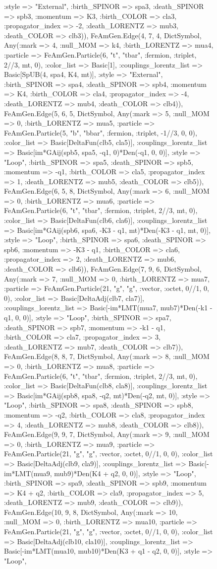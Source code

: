 \documentclass{revtex4}
\begin{document}
\begin{figure}[!htb]
\begin{center}
{:style => "External", :birth_SPINOR => spa3, :death_SPINOR => spb3, :momentum => K3, :birth_COLOR => cla3, :propagator_index => -2, :death_LORENTZ => mub3, :death_COLOR => clb3)), FeAmGen.Edge(4, 7, 4, Dict{Symbol, Any}(:mark => 4, :null_MOM => k4, :birth_LORENTZ => mua4, :particle => FeAmGen.Particle(6, "t", "tbar", :fermion, :triplet, 2//3, mt, 0), :color_list => Basic[1], :couplings_lorentz_list => Basic[SpUB(4, spa4, K4, mt)], :style => "External", :birth_SPINOR => spa4, :death_SPINOR => spb4, :momentum => K4, :birth_COLOR => cla4, :propagator_index => -4, :death_LORENTZ => mub4, :death_COLOR => clb4)), FeAmGen.Edge(5, 6, 5, Dict{Symbol, Any}(:mark => 5, :null_MOM => 0, :birth_LORENTZ => mua5, :particle => FeAmGen.Particle(5, "b", "bbar", :fermion, :triplet, -1//3, 0, 0), :color_list => Basic[DeltaFun(clb5, cla5)], :couplings_lorentz_list => Basic[im*GAij(spb5, spa5, -q1, 0)*Den(-q1, 0, 0)], :style => "Loop", :birth_SPINOR => spa5, :death_SPINOR => spb5, :momentum => -q1, :birth_COLOR => cla5, :propagator_index => 1, :death_LORENTZ => mub5, :death_COLOR => clb5)), FeAmGen.Edge(6, 5, 8, Dict{Symbol, Any}(:mark => 6, :null_MOM => 0, :birth_LORENTZ => mua6, :particle => FeAmGen.Particle(6, "t", "tbar", :fermion, :triplet, 2//3, mt, 0), :color_list => Basic[DeltaFun(clb6, cla6)], :couplings_lorentz_list => Basic[im*GAij(spb6, spa6, -K3 - q1, mt)*Den(-K3 - q1, mt, 0)], :style => "Loop", :birth_SPINOR => spa6, :death_SPINOR => spb6, :momentum => -K3 - q1, :birth_COLOR => cla6, :propagator_index => 2, :death_LORENTZ => mub6, :death_COLOR => clb6)), FeAmGen.Edge(7, 9, 6, Dict{Symbol, Any}(:mark => 7, :null_MOM => 0, :birth_LORENTZ => mua7, :particle => FeAmGen.Particle(21, "g", "g", :vector, :octet, 0//1, 0, 0), :color_list => Basic[DeltaAdj(clb7, cla7)], :couplings_lorentz_list => Basic[-im*LMT(mua7, mub7)*Den(-k1 - q1, 0, 0)], :style => "Loop", :birth_SPINOR => spa7, :death_SPINOR => spb7, :momentum => -k1 - q1, :birth_COLOR => cla7, :propagator_index => 3, :death_LORENTZ => mub7, :death_COLOR => clb7)), FeAmGen.Edge(8, 8, 7, Dict{Symbol, Any}(:mark => 8, :null_MOM => 0, :birth_LORENTZ => mua8, :particle => FeAmGen.Particle(6, "t", "tbar", :fermion, :triplet, 2//3, mt, 0), :color_list => Basic[DeltaFun(clb8, cla8)], :couplings_lorentz_list => Basic[im*GAij(spb8, spa8, -q2, mt)*Den(-q2, mt, 0)], :style => "Loop", :birth_SPINOR => spa8, :death_SPINOR => spb8, :momentum => -q2, :birth_COLOR => cla8, :propagator_index => 4, :death_LORENTZ => mub8, :death_COLOR => clb8)), FeAmGen.Edge(9, 9, 7, Dict{Symbol, Any}(:mark => 9, :null_MOM => 0, :birth_LORENTZ => mua9, :particle => FeAmGen.Particle(21, "g", "g", :vector, :octet, 0//1, 0, 0), :color_list => Basic[DeltaAdj(clb9, cla9)], :couplings_lorentz_list => Basic[-im*LMT(mua9, mub9)*Den(K4 + q2, 0, 0)], :style => "Loop", :birth_SPINOR => spa9, :death_SPINOR => spb9, :momentum => K4 + q2, :birth_COLOR => cla9, :propagator_index => 5, :death_LORENTZ => mub9, :death_COLOR => clb9)), FeAmGen.Edge(10, 9, 8, Dict{Symbol, Any}(:mark => 10, :null_MOM => 0, :birth_LORENTZ => mua10, :particle => FeAmGen.Particle(21, "g", "g", :vector, :octet, 0//1, 0, 0), :color_list => Basic[DeltaAdj(clb10, cla10)], :couplings_lorentz_list => Basic[-im*LMT(mua10, mub10)*Den(K3 + q1 - q2, 0, 0)], :style => "Loop", }
\end{center}
\end{figure}
\end{document}
